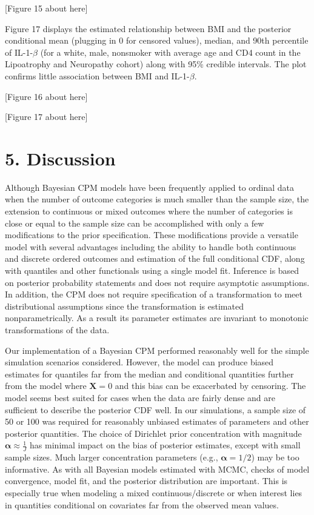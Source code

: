 \documentclass[
]{article}
\begin{document}
{[}Figure 15 about here{]}

Figure 17 displays the estimated relationship between BMI and the posterior conditional mean (plugging in 0 for censored values), median, and 90th percentile of IL-1-\(\beta\) (for a white, male, nonsmoker with average age and CD4 count in the Lipoatrophy and Neuropathy cohort) along with 95\% credible intervals. The plot confirms little association between BMI and IL-1-\(\beta\).

{[}Figure 16 about here{]}

{[}Figure 17 about here{]}

\hypertarget{discussion}{%
\section{5. Discussion}\label{discussion}}

Although Bayesian CPM models have been frequently applied to ordinal data when the number of outcome categories is much smaller than the sample size, the extension to continuous or mixed outcomes where the number of categories is close or equal to the sample size can be accomplished with only a few modifications to the prior specification. These modifications provide a versatile model with several advantages including the ability to handle both continuous and discrete ordered outcomes and estimation of the full conditional CDF, along with quantiles and other functionals using a single model fit. Inference is based on posterior probability statements and does not require asymptotic assumptions. In addition, the CPM does not require specification of a transformation to meet distributional assumptions since the transformation is estimated nonparametrically. As a result its parameter estimates are invariant to monotonic transformations of the data.

Our implementation of a Bayesian CPM performed reasonably well for the simple simulation scenarios considered. However, the model can produce biased estimates
for quantiles far from the median and conditional quantities further from the model where \(\boldsymbol{X}=0\) and this bias can be exacerbated by censoring.
The model seems best suited for cases when the data are fairly dense and are sufficient to describe the posterior CDF well. In our simulations, a sample size of 50 or 100 was required for reasonably unbiased estimates of parameters and other posterior quantities. The choice of Dirichlet prior concentration with magnitude \(\boldsymbol{\alpha} \approx \frac{1}{J}\) has minimal impact on the bias of posterior estimates, except with small sample sizes. Much larger concentration parameters (e.g., \(\boldsymbol{\alpha}=1/2\)) may be too informative. As with all Bayesian models estimated with MCMC, checks of model convergence, model fit, and the posterior distribution are important. This is especially true when modeling a mixed continuous/discrete or when interest lies in quantities conditional on covariates far from the observed mean values.
\end{document}
